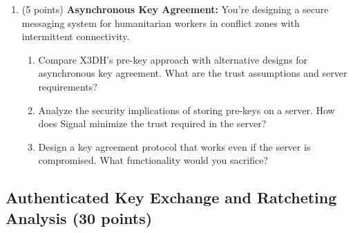 \documentclass[10pt,a4paper,american]{article}
\begin{document}
\begin{enumerate}
	\item (5 points) \textbf{Asynchronous Key Agreement:}
	      You're designing a secure messaging system for humanitarian workers in conflict zones with intermittent connectivity.
	      \begin{enumerate}
		      \item Compare X3DH's pre-key approach with alternative designs for asynchronous key agreement. What are the trust assumptions and server requirements?
		      \item Analyze the security implications of storing pre-keys on a server. How does Signal minimize the trust required in the server?
		      \item Design a key agreement protocol that works even if the server is compromised. What functionality would you sacrifice?
	      \end{enumerate}
\end{enumerate}

\subsection{Authenticated Key Exchange and Ratcheting Analysis (30 points)}
\end{document}
